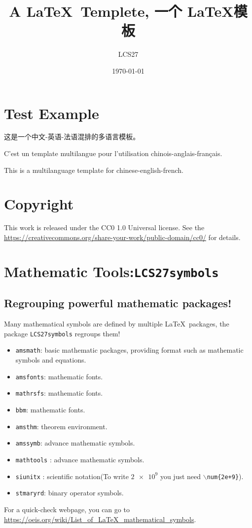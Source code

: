 \documentclass[a4paper,twoside,12pt]{article}
\title{A \LaTeX \ Templete, 一个 \LaTeX 模板}
\author{LCS27}
\institute{Overleaf模板作者}
\date{\today}
\begin{document}
\MakeSimpleTitle
\section{Test Example}
这是一个中文-英语-法语混排的多语言模板。\par
C'est un template multilangue pour l'utilisation chinois-anglais-français.\par
This is a multilanguage template for chinese-english-french.\par

\section{Copyright}
This work is released under the CC0 1.0 Universal license. See the \url{https://creativecommons.org/share-your-work/public-domain/cc0/} for details.

\section{Mathematic Tools:\texttt{LCS27symbols}}

\subsection{Regrouping powerful mathematic packages!}
Many mathematical symbols are defined by multiple \LaTeX \ packages, the package \texttt{LCS27symbols} regroups them!
\begin{itemize}
\item  \texttt{amsmath}: basic mathematic packages, providing format such as mathematic symbols and equations.
\item  \texttt{amsfonts}: mathematic fonts.
\item  \texttt{mathrsfs}: mathematic fonts.
\item  \texttt{bbm}: mathematic fonts.
\item  \texttt{amsthm}: theorem environment.
\item  \texttt{amssymb}: advance mathematic symbols.
\item  \texttt{mathtools} : advance mathematic symbols.
\item  \texttt{siunitx} : scientific notation(\Eg  To write $\num{2e+9}$ you just need \texttt{$\backslash$num\{2e+9\}}).
\item  \texttt{stmaryrd}: binary operator symbols.
\end{itemize}
For a quick-check webpage, you can go to \url{https://oeis.org/wiki/List_of_LaTeX_mathematical_symbols}.
\end{document}

